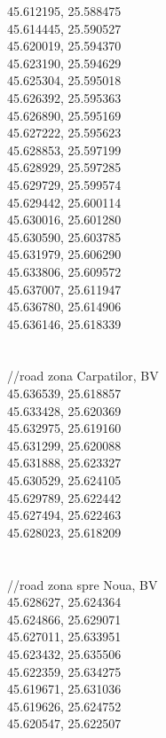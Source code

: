 \documentclass {article}
\begin{document}
\begin{appendices}
45.612195, 25.588475\\
45.614445, 25.590527\\
45.620019, 25.594370\\
45.623190, 25.594629\\
45.625304, 25.595018\\
45.626392, 25.595363\\
45.626890, 25.595169\\
45.627222, 25.595623\\
45.628853, 25.597199\\
45.628929, 25.597285\\
45.629729, 25.599574\\
45.629442, 25.600114\\
45.630016, 25.601280\\
45.630590, 25.603785\\
45.631979, 25.606290\\
45.633806, 25.609572\\
45.637007, 25.611947\\
45.636780, 25.614906\\
45.636146, 25.618339\\
\\
\\
//road zona Carpatilor, BV\\
45.636539, 25.618857\\
45.633428, 25.620369\\
45.632975, 25.619160\\
45.631299, 25.620088\\
45.631888, 25.623327\\
45.630529, 25.624105\\
45.629789, 25.622442\\
45.627494, 25.622463\\
45.628023, 25.618209\\
\\
\\
//road zona spre Noua, BV\\
45.628627, 25.624364\\
45.624866, 25.629071\\
45.627011, 25.633951\\
45.623432, 25.635506\\
45.622359, 25.634275\\
45.619671, 25.631036\\
45.619626, 25.624752\\
45.620547, 25.622507\\
\\

\end{appendices}
\end{document}
